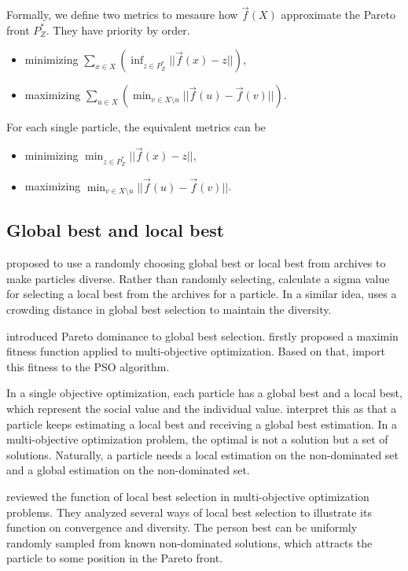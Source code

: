 \documentclass[12pt]{article}
\begin{document}
Formally, we define two metrics to mesaure how $ \vec{f}(X) $ approximate the Pareto front $ P^{*}_{Z} $. They have priority by order.
\begin{itemize}
\item minimizing $ \sum_{x \in X}  \left( \inf_{z \in P^{*}_{Z} } || \vec{f}(x) - z  || \right) $,
\item maximizing $ \sum_{u \in X} \left( \min_{v \in X \setminus u} || \vec{f}(u) - \vec{f}(v) || \right) $.
\end{itemize}

For each single particle, the equivalent metrics can be 
\begin{itemize}
\item minimizing $  \min_{z \in P^{*}_{Z} } || \vec{f}(x) - z  ||  $,
\item maximizing $ \min_{v \in X \setminus u} || \vec{f}(u) - \vec{f}(v) ||  $.
\end{itemize}

\subsection{Global best and local best}

\cite{coello2002mopso} proposed to use a randomly choosing global best or local best from archives to make particles diverse. 
Rather than randomly selecting, \cite{mostaghim2003strategies} calculate a sigma value for selecting a local best from the archives for a particle.
In a similar idea, \cite{raquel2005effective} uses a crowding distance in global best selection to maintain the diversity.

\cite{alvarez2005mopso} introduced Pareto dominance to global best selection.
\cite{balling2003maximin} firstly proposed a maximin fitness function applied to multi-objective optimization. 
Based on that, \cite{li2004better} import this fitness to the PSO algorithm.

In a single objective optimization, each particle has a global best and a local best, which represent the social value and the individual value. 
\cite{andras2012bayesian} interpret this as that a particle keeps estimating a local best and receiving a global best estimation.
In a multi-objective optimization problem, the optimal is not a solution but a set of solutions.
Naturally, a particle needs a local estimation on the non-dominated set and a global estimation on the non-dominated set. 

\cite{branke2006selecting} reviewed the function of local best selection in multi-objective optimization problems. 
They analyzed several ways of local best selection to illustrate its function on convergence and diversity.
The person best can be uniformly randomly sampled from known non-dominated solutions, which attracts the particle to some position in the Pareto front.
\end{document}
